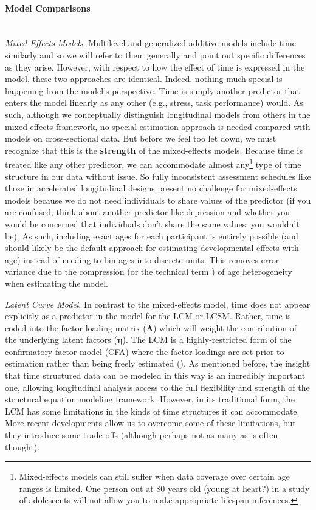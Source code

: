 \documentclass[11pt]{article}
\newcommand{\subsubsubsection}[1]{\paragraph{#1}\mbox{}\\}  %
\begin{document}
\subsubsubsection{Model Comparisons}
\qquad \textit{Mixed-Effects Models}. Multilevel and generalized additive models include time similarly and so we will refer to them generally and point out specific differences as they arise. However, with respect to how the effect of time is expressed in the model, these two approaches are identical. Indeed, nothing much special is happening from the model’s perspective. Time is simply another predictor that enters the model linearly as any other (e.g., stress, task performance) would. As such, although we conceptually distinguish longitudinal models from others in the mixed-effects framework, no special estimation approach is needed compared with models on cross-sectional data. But before we feel too let down, we must recognize that this is the \textbf{strength} of the mixed-effects models. Because time is treated like any other predictor, we can accommodate almost any\footnote{Mixed-effects models can still suffer when data coverage over certain age ranges is limited. One person out at 80 years old (young at heart?) in a study of adolescents will not allow you to make appropriate lifespan inferences.} type of time structure in our data without issue. So fully inconsistent assessment schedules like those in accelerated longitudinal designs present no challenge for mixed-effects models because we do not need individuals to share values of the predictor (if you are confused, think about another predictor like depression and whether you would be concerned that individuals don’t share the same values; you wouldn’t be). As such, including exact ages for each participant is entirely possible (and should likely be the default approach for estimating developmental effects with age) instead of needing to bin ages into discrete units. This removes error variance due to the compression (or the technical term ) of age heterogeneity when estimating the model.

\qquad \textit{Latent Curve Model}. In contrast to the mixed-effects model, time does not appear explicitly as a predictor in the model for the LCM or LCSM. Rather, time is coded into the factor loading matrix ($\boldsymbol{\Lambda}$) which will weight the contribution of the underlying latent factors ($\boldsymbol{\eta}$). The LCM is a highly-restricted form of the confirmatory factor model (CFA) where the factor loadings are set prior to estimation rather than being freely estimated (\cite{meredith_latent_1990}). As mentioned before, the insight that time structured data can be modeled in this way is an incredibly important one, allowing longitudinal analysis access to the full flexibility and strength of the structural equation modeling framework. However, in its traditional form, the LCM has some limitations in the kinds of time structures it can accommodate. More recent developments allow us to overcome some of these limitations, but they introduce some trade-offs (although perhaps not as many as is often thought).
\end{document}
